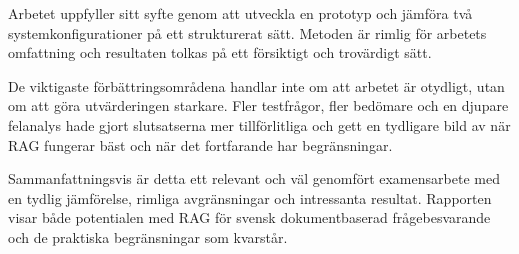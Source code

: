 \documentclass[12pt,a4paper]{article}
\begin{document}
Arbetet uppfyller sitt syfte genom att utveckla en prototyp och jämföra två systemkonfigurationer på ett strukturerat sätt. Metoden är rimlig för arbetets omfattning och resultaten tolkas på ett försiktigt och trovärdigt sätt.

De viktigaste förbättringsområdena handlar inte om att arbetet är otydligt, utan om att göra utvärderingen starkare. Fler testfrågor, fler bedömare och en djupare felanalys hade gjort slutsatserna mer tillförlitliga och gett en tydligare bild av när RAG fungerar bäst och när det fortfarande har begränsningar.

Sammanfattningsvis är detta ett relevant och väl genomfört examensarbete med en tydlig jämförelse, rimliga avgränsningar och intressanta resultat. Rapporten visar både potentialen med RAG för svensk dokumentbaserad frågebesvarande och de praktiska begränsningar som kvarstår.
\end{document}
